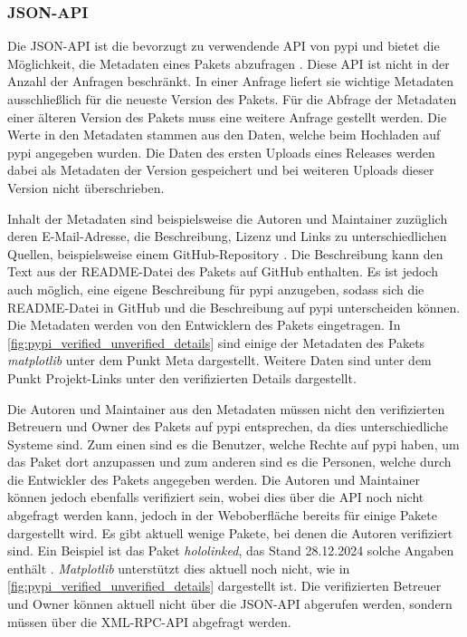 \subsubsection*{JSON-API}
\label{subsubsec:pypi_json_api}
Die JSON-API ist die bevorzugt zu verwendende API von \gls{pypi} und bietet die Möglichkeit, die Metadaten eines Pakets abzufragen \autocite{python_software_foundation_warehouse_2024}.
Diese API ist nicht in der Anzahl der Anfragen beschränkt.
In einer Anfrage liefert sie wichtige Metadaten ausschließlich für die neueste Version des Pakets.
Für die Abfrage der Metadaten einer älteren Version des Pakets muss eine weitere Anfrage gestellt werden.
Die Werte in den Metadaten stammen aus den Daten, welche beim Hochladen auf \gls{pypi} angegeben wurden.
Die Daten des ersten Uploads eines Releases werden dabei als Metadaten der Version gespeichert und bei weiteren Uploads dieser Version nicht überschrieben.

Inhalt der Metadaten sind beispielsweise die Autoren und Maintainer zuzüglich deren E-Mail-Adresse, die Beschreibung, Lizenz und Links zu unterschiedlichen Quellen, beispielsweise einem GitHub-Repository \autocite{python_software_foundation_warehouse_2024}.
Die Beschreibung kann den Text aus der README-Datei des Pakets auf GitHub enthalten.
Es ist jedoch auch möglich, eine eigene Beschreibung für \gls{pypi} anzugeben, sodass sich die README-Datei in GitHub und die Beschreibung auf \gls{pypi} unterscheiden können.
Die Metadaten werden von den Entwicklern des Pakets eingetragen.
In \autoref{fig:pypi_verified_unverified_details} sind einige der Metadaten des Pakets \emph{matplotlib} unter dem Punkt \glqq Meta\grqq{} dargestellt.
Weitere Daten sind unter dem Punkt \glqq Projekt-Links\grqq{} unter den verifizierten Details dargestellt.

Die Autoren und Maintainer aus den Metadaten müssen nicht den verifizierten Betreuern und Owner des Pakets auf \gls{pypi} entsprechen, da dies unterschiedliche Systeme sind.
Zum einen sind es die Benutzer, welche Rechte auf \gls{pypi} haben, um das Paket dort anzupassen und zum anderen sind es die Personen, welche durch die Entwickler des Pakets angegeben werden.
Die Autoren und Maintainer können jedoch ebenfalls verifiziert sein, wobei dies über die API noch nicht abgefragt werden kann, jedoch in der Weboberfläche bereits für einige Pakete dargestellt wird.
Es gibt aktuell wenige Pakete, bei denen die Autoren verifiziert sind.
Ein Beispiel ist das Paket \emph{hololinked}, das Stand 28.12.2024 solche Angaben enthält \autocite{venkatasubramanian_vaidyanathan_hololinked_2024}.
\emph{Matplotlib} unterstützt dies aktuell noch nicht, wie in \autoref{fig:pypi_verified_unverified_details} dargestellt ist.
Die verifizierten Betreuer und Owner können aktuell nicht über die JSON-API abgerufen werden, sondern müssen über die XML-RPC-API abgefragt werden.

